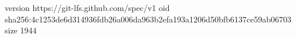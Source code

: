 version https://git-lfs.github.com/spec/v1
oid sha256:4c1253de6d314936fdb26a006da963b2efa193a1206d50bfb6137ce59ab06703
size 1944
